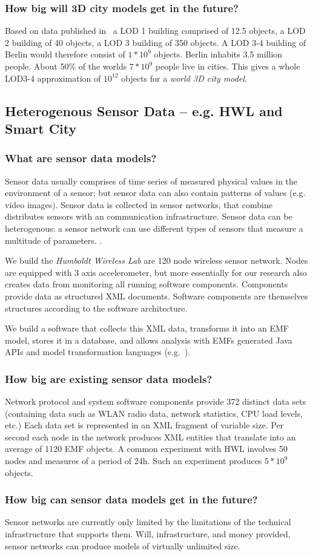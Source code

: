 \subsubsection{How big will 3D city models get in the future?}
Based on data published in~\cite{CityGMLBerlinDB} a LOD 1 building comprised of 12.5 objects, a LOD 2 building of 40 objects, a LOD 3 building of 350 objects. A LOD 3-4 building of Berlin would therefore consist of $1*10^9$ objects. Berlin inhabits 3.5 million people. About 50\% of the worlds $7*10^9$ people live in cities. This gives a whole LOD3-4 approximation of $10^{12}$ objects for a \emph{world 3D city model}.

\subsection{Heterogenous Sensor Data -- e.g. HWL and Smart City}

\subsubsection{What are sensor data models?}
Sensor data usually comprises of time series of measured physical values in the environment of a sensor; but sensor data can also contain patterns of values (e.g. video images). Sensor data is collected in sensor networks, that combine distributes sensors with an communication infrastructure. Sensor data can be heterogenous: a sensor network can use different types of sensors that measure a multitude of parameters. 
. 

We build the \emph{Humboldt Wireless Lab} are 120 node wireless sensor network. Nodes are equipped with 3 axis accelerometer, but more essentially for our research also creates data from monitoring all running software components. Components provide data as structured XML documents. Software components are themselves structures according to the software architecture.

We build a software that collects this XML data, transforms it into an EMF model, stores it in a database, and allows analysis with EMFs generated Java APIs and model transformation languages (e.g.~\cite{SMTLpaper}).

\subsubsection{How big are existing sensor data models?}
Network protocol and system software components provide 372 distinct data sets (containing data such as WLAN radio data, network statistics, CPU load levels, etc.) Each data set is represented in an XML fragment of variable size. Per second each node in the network produces XML entities that translate into an average of 1120 EMF objects. A common experiment with HWL involves 50 nodes and measures of a period of 24h. Such an experiment produces $5*10^9$ objects. 

\subsubsection{How big can sensor data models get in the future?}
Sensor networks are currently only limited by the limitations of the technical infrastructure that supports them. Will, infrastructure, and money provided, sensor networks can produce models of virtually unlimited size. 

